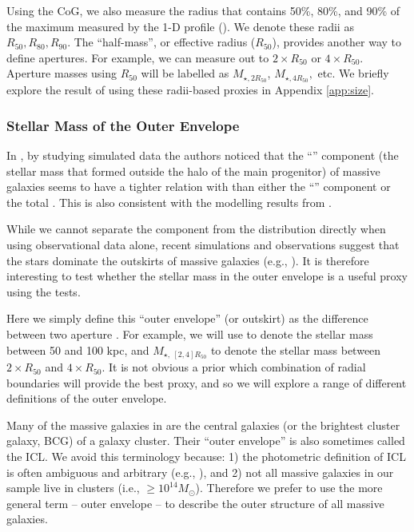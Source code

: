\documentclass[fleqn,usenatbib,useAMS]{mnras}
\begin{document}
\begin{CJK*}{UTF8}{gbsn}
    Using the CoG, we also measure the radius that contains 50\%, 80\%, and 90\% of the maximum
    \mstar{} measured by the 1-D profile (\mmax{}).
    We denote these radii as $R_{50}, R_{80}, R_{90}$.
    The ``half-mass'', or effective radius ($R_{50}$), provides another way to define apertures.
    For example, we can measure \mstar{} out to $2\times R_{50}$ or $4\times R_{50}$. 
    Aperture masses using $R_{50}$ will be labelled as $M_{\star, 2R_{50}}$, $M_{\star, 4R_{50}},$
    etc. 
    We briefly explore the result of using these radii-based proxies in Appendix \ref{app:size}.

\subsubsection{Stellar Mass of the Outer Envelope}
    \label{sec:menvelope}

    In \citet{Bradshaw2020}, by studying simulated data the authors noticed that the ``\exsitu{}''
    component (the stellar mass that formed outside the halo of the main progenitor) of massive
    galaxies seems to have a tighter relation with \mvir{} than either the ``\insitu{}'' component
    or the total \mstar{}.
    This is also consistent with the modelling results from \citet{Huang2020}.

    While we cannot separate the \exsitu{} component from the \mstar{} distribution directly when
    using observational data alone, recent simulations and observations suggest that the \exsitu{}
    stars dominate the outskirts of massive galaxies (e.g., \citealt{Lackner2012,
    RodriguezGomez2016, Pulsoni2021}).
    It is therefore interesting to test whether the stellar mass in the outer envelope is a useful
    \mvir{} proxy using the \topn{} tests.

    Here we simply define this ``outer envelope'' (or outskirt) \mstar{} as the difference between
    two aperture \mstar{}.
    For example, we will use  to denote the stellar mass between 50 and 100 kpc, and
    $M_{\star,\ [2,4]R_{50}}$ to denote the stellar mass between $2 \times R_{50}$ and $4 \times
    R_{50}$. 
    It is not obvious a prior which combination of radial boundaries will provide the best
    \exsitu{} \mstar{} proxy, and so we will explore a range of different definitions of the outer
    envelope.

    Many of the massive galaxies in \citet{Huang2020} are the central galaxies (or the brightest
    cluster galaxy, BCG) of a galaxy cluster. 
    Their ``outer envelope'' is also sometimes called the ICL.  
    We avoid this terminology because:
    1) the photometric definition of ICL is often ambiguous and arbitrary (e.g.,
    \citealt{Kluge2021}), and
    2) not all massive galaxies in our sample live in clusters (i.e., \mvir{}$\geq 10^{14}
    M_{\odot}$).  Therefore we prefer to use the more general term -- outer envelope -- to describe
    the outer structure of all massive galaxies.
    

\end{CJK*}
\end{document}
